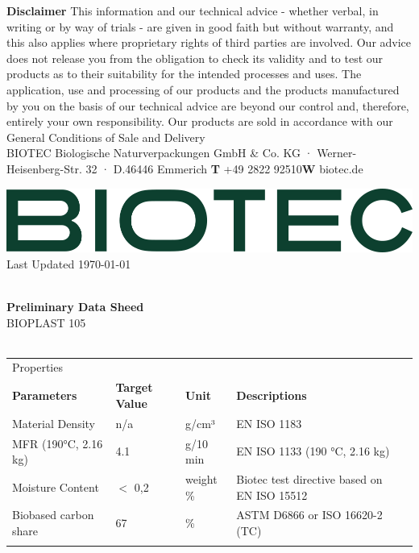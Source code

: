 \documentclass{article}
\begin{document}
\vspace*{\fill}
{\scriptsize
    \textbf{Disclaimer} This information and our technical advice - whether verbal, in writing or by way of trials - are given in good faith but without warranty, and this also applies where proprietary rights of third parties are involved. Our advice does not release you from the obligation to check its validity and to test our products as to their suitability for the intended processes and uses. The application, use and processing of our products and the products manufactured by you on the basis of our technical advice are beyond our control and, therefore, entirely your own responsibility. Our products are sold in accordance with our General Conditions of Sale and Delivery \\
 BIOTEC Biologische Naturverpackungen GmbH \& Co. KG · Werner-Heisenberg-Str. 32 · D.46446 Emmerich \hfill \textbf{T} +49 2822 92510\qquad \textbf{W} biotec.de}
\clearpage
\begin{flushleft}
\includegraphics[scale=0.20]{biotec}
\hfill\tiny Last Updated \today
\end{flushleft}
\begin{flushleft}
\hspace{1cm}\\
\textbf{Preliminary Data Sheed}\\
BIOPLAST 105\\
\hspace{1cm}\\
\end{flushleft}
\begin{center}
\begin{tabularx}
{\textwidth}{X l  l  l  l }\rowcolor{color_title}Properties &  &  &  &  \\
\textbf{Parameters} & \textbf{Target Value} & \textbf{Unit} & \textbf{Descriptions} &  \\
Material Density  & n/a & g/cm³ & EN ISO 1183 &  \\
\arrayrulecolor{line_color}\hline
MFR (190°C, 2.16 kg) & 4.1 & g/10 min & EN ISO 1133 (190 °C, 2.16 kg) &  \\
\arrayrulecolor{line_color}\hline
Moisture Content & \(<\) 0,2 & weight \% & Biotec test directive based on EN ISO 15512 &  \\
\arrayrulecolor{line_color}\hline
Biobased carbon share & 67 & \% & ASTM D6866 or ISO 16620-2 (TC) &  \\
\arrayrulecolor{line_color}\hline

\end{tabularx}
\end{center}
\end{document}
